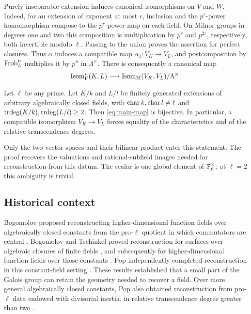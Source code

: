 Purely inseparable extension induces canonical isomorphisms on $V$
and $W$. Indeed, for an extension of exponent at most $r$, inclusion
and the $p^r$-power homomorphism compose to the $p^r$-power map on
each field. On Milnor groups in degrees one and two this composition
is multiplication by $p^r$ and $p^{2r}$, respectively, both invertible
modulo $\ell$. Passing to the union proves the assertion for perfect
closures. Thus $\alpha$ induces a compatible map $\alpha_1:V_K\to V_L$,
and postcomposition by $\operatorname{Frob}_L^n$ multiplies it by $p^n$ in
$\Lambda^\times$. There is consequently a canonical map
\begin{equation}\label{eq:main-map}
 \operatorname{Isom}^i_{\mathrm F}(K,L)\longrightarrow
 \operatorname{Isom}_{\mathrm M}(V_K,V_L)/\Lambda^\times.
\end{equation}

\begin{theorem}\label{thm:main}
Let $\ell$ be any prime. Let $K/k$ and $L/l$ be finitely generated
extensions of arbitrary algebraically closed fields, with
$\operatorname{char} k,\operatorname{char} l\ne\ell$ and
$\operatorname{trdeg}(K/k),\operatorname{trdeg}(L/l)\ge2$. Then \eqref{eq:main-map} is bijective.
In particular, a compatible isomorphism $V_K\to V_L$ forces equality
of the characteristics and of the relative transcendence degrees.
\end{theorem}

Only the two vector spaces and their bilinear product enter this
statement. The proof recovers the valuations and rational-subfield
images needed for reconstruction from this datum. The scalar is one
global element of $\mathbb F_\ell^\times$; at $\ell=2$ this ambiguity is trivial.

\subsection{Historical context}

Bogomolov proposed reconstructing higher-dimensional function fields over
algebraically closed constants from the pro-$\ell$ quotient in which
commutators are central \cite{Bogomolov1991}. Bogomolov and Tschinkel
proved reconstruction for surfaces over algebraic closures of finite
fields \cite{BT2008}, and subsequently for higher-dimensional function
fields over those constants \cite{BT2011}. Pop independently completed
reconstruction in this constant-field setting \cite{PopBI2012}.
These results established that a small part of the Galois group can
retain the geometry needed to recover a field. Over more general
algebraically closed constants, Pop also obtained reconstruction from
pro-$\ell$ data endowed with divisorial inertia, in relative
transcendence degree greater than two \cite[Theorem~1.1]{Pop2018}.

